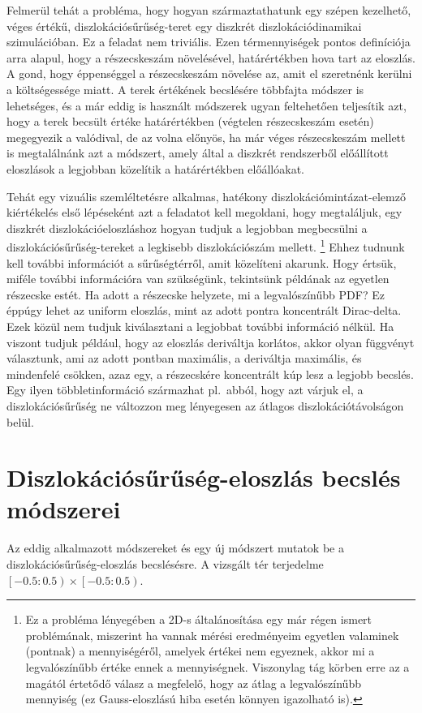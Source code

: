 \documentclass[10pt,a4paper]{scrartcl}
\begin{document}
Felmerül tehát a probléma, hogy hogyan származtathatunk egy szépen kezelhető, véges értékű, diszlokációsűrűség-teret egy diszkrét diszlokációdinamikai szimulációban. Ez a feladat nem triviális. Ezen térmennyiségek pontos definíciója arra alapul, hogy a részecskeszám növelésével, határértékben hova tart az eloszlás. A gond, hogy éppenséggel a részecskeszám növelése az, amit el szeretnénk kerülni a költségessége miatt. A terek értékének becslésére többfajta módszer is lehetséges, és a már eddig is használt módszerek ugyan feltehetően teljesítik azt, hogy a terek becsült értéke határértékben (végtelen részecskeszám esetén) megegyezik a valódival, de az volna előnyös, ha már véges részecskeszám mellett is megtalálnánk azt a módszert, amely által a diszkrét rendszerből előállított eloszlások a legjobban közelítik a határértékben előállóakat.

Tehát egy vizuális szemléltetésre alkalmas, hatékony diszlokációmintázat-elemző kiértékelés első lépéseként azt a feladatot kell megoldani, hogy megtaláljuk, egy diszkrét diszlokációeloszláshoz hogyan tudjuk a legjobban megbecsülni a diszlokációsűrűség-tereket a legkisebb diszlokációszám mellett.
\footnote{Ez a probléma lényegében a 2D-s általánosítása egy már régen ismert problémának, miszerint ha vannak mérési eredményeim egyetlen valaminek (pontnak) a mennyiségéről, amelyek értékei nem egyeznek, akkor mi a legvalószínűbb értéke ennek a mennyiségnek. Viszonylag tág körben erre az a magától értetődő válasz a megfelelő, hogy az átlag a legvalószínűbb mennyiség (ez Gauss-eloszlású hiba esetén könnyen igazolható is).} Ehhez tudnunk kell további információt a sűrűségtérről, amit közelíteni akarunk. Hogy értsük, miféle további információra van szükségünk, tekintsünk példának az egyetlen részecske estét. Ha adott a részecske helyzete, mi a legvalószínűbb PDF? Ez éppúgy lehet az uniform eloszlás, mint az adott pontra koncentrált Dirac-delta. Ezek közül nem tudjuk kiválasztani a legjobbat további információ nélkül. Ha viszont tudjuk például, hogy az eloszlás deriváltja korlátos, akkor olyan függvényt választunk, ami az adott pontban maximális, a deriváltja maximális, és mindenfelé csökken, azaz egy, a részecskére koncentrált kúp lesz a legjobb becslés. Egy ilyen többletinformáció származhat pl.\ abból, hogy azt várjuk el, a diszlokációsűrűség ne változzon meg lényegesen az átlagos diszlokációtávolságon belül.

\section{Diszlokációsűrűség-eloszlás becslés módszerei}
Az eddig alkalmazott módszereket és egy új módszert mutatok be a diszlokációsűrűség-eloszlás becslésésre. A vizsgált tér terjedelme $\left[ { - 0.5:0.5} \right) \times \left[ { - 0.5:0.5} \right)$.
\end{document}

